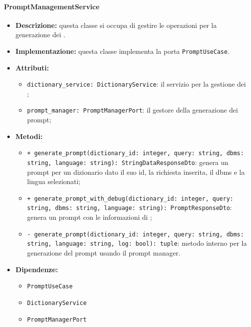 \paragraph{PromptManagementService} \label{PromptManagementService}
\begin{itemize}
    \item \textbf{Descrizione:} questa classe si occupa di gestire le operazioni per la generazione dei .
    \item \textbf{Implementazione:} questa classe implementa la porta \texttt{PromptUseCase}. 
    \item \textbf{Attributi:}
    \begin{itemize}
        \item \texttt{dictionary\_service: DictionaryService}: il servizio per la gestione dei ;
        \item \texttt{prompt\_manager: PromptManagerPort}: il gestore della generazione dei prompt;
    \end{itemize}
    \item \textbf{Metodi:}
    \begin{itemize}
        \item \texttt{+ generate\_prompt(dictionary\_id: integer, query: string, dbms: string, language: string): StringDataResponseDto}: genera un prompt per un dizionario dato il suo id, la richiesta inserita, il dbms e la lingua selezionati;
        \item \texttt{+ generate\_prompt\_with\_debug(dictionary\_id: integer, query: string, dbms: string, language: string): PromptResponseDto}: genera un prompt con le informazioni di ;
        \item \texttt{- generate\_prompt(dictionary\_id: integer, query: string, dbms: string, language: string, log: bool): tuple}: metodo interno per la generazione del prompt usando il prompt manager.
    \end{itemize}
    \item \textbf{Dipendenze:}
    \begin{itemize}
        \item \texttt{PromptUseCase}
        \item \texttt{DictionaryService}
        \item \texttt{PromptManagerPort}
    \end{itemize}
\end{itemize}  